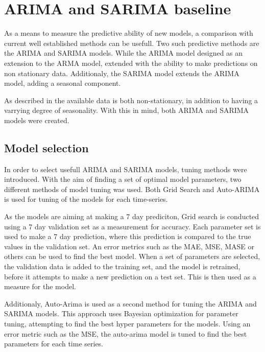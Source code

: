 \section{ARIMA and SARIMA baseline}
\label{section:Architecture:Baselines:Arima}

\iffalse
This section presents the overarching methods and method architectures used in this paper.
In an effort to analyse data and make predictions on the problem space, predictive models are applied.
Using well established methods, we intend on creating baseline predictions in order to evaluate a new model.
These baseline methods are pressented here.
\fi


As a means to measure the predictive ability of new models, a comparison with current well established methods can be usefull.
Two such predictive methods are the ARIMA and SARIMA models.
While the ARIMA model designed as an extension to the ARMA model, extended with the ability to make predictions on non stationary data.
Additionaly, the SARIMA model extends the ARIMA model, adding a seasonal component.

As described in  the available data is both non-stationary, in addition to having a varrying degree of seasonality.
With this in mind, both ARIMA and SARIMA models were created.


\subsection{Model selection}
In order to select usefull ARIMA and SARIMA models, tuning methods were introduced.
With the aim of finding a set of optimal model parameters, two different methods of model tuning was used.
Both Grid Search and Auto-ARIMA %
is used for tuning of the models for each time-series.

As the models are aiming at making a 7 day prediciton, Grid search is conducted using a 7 day validation set as a measurement for accuracy.
Each parameter set is used to make a 7 day prediction, where this prediction is compared to the true values in the validation set.
An error metrics such as the MAE, MSE, MASE or others can be used to find the best model.
When a set of parameters are selected, the validation data is added to the training set, and the model is retrained, before it attempts to make a new prediction on a test set.
This is then used as a measure for the model.

Additionaly, Auto-Arima is used as a second method for tuning the ARIMA and SARIMA models.
This approach uses Bayesian optimization for parameter tuning, attempting to find the best hyper parameters for the models.
Using an error metric such as the MSE, the auto-arima model is tuned to find the best parameters for each time series.

